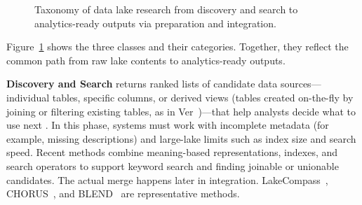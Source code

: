 \documentclass[sigconf,nonacm]{acmart}
\begin{document}
\begin{figure}[t]
\caption{Taxonomy of data lake research from discovery and search to analytics-ready outputs via preparation and integration.}
\label{fig:taxonomy}
\end{figure}


Figure~\ref{fig:taxonomy} shows the three classes and their categories. Together, they reflect the common path from raw lake contents to analytics-ready outputs.

\textbf{Discovery and Search} returns ranked lists of candidate data sources---individual tables, specific columns, or derived views (tables created on-the-fly by joining or filtering existing tables, as in Ver~\cite{10184768})---that help analysts decide what to use next \cite{10184768,10.14778/3681954.3682005}. In this phase, systems must work with incomplete metadata (for example, missing descriptions) and large-lake limits such as index size and search speed. Recent methods combine meaning-based representations, indexes, and search operators to support keyword search and finding joinable or unionable candidates. The actual merge happens later in integration. LakeCompass~\cite{10.14778/3685800.3685880}, CHORUS~\cite{10.14778/3659437.3659461}, and BLEND~\cite{11112882} are representative methods.
\end{document}
